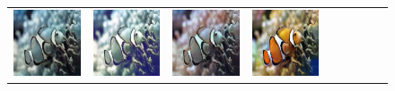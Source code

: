 \begin{figure}[t]
\begin{center}
\begin{tabular}{ccccccccc}
			\includegraphics[width = 0.10\linewidth,height=0.10\linewidth]{figures/ch3/compare/EUVP/Ucolor/264298_00035269.jpg} & \hspace{-0.40cm}
			\includegraphics[width = 0.10\linewidth,height=0.10\linewidth]{figures/ch3/compare/EUVP/STSC/264298_00035269.jpg}   & \hspace{-0.40cm}
			\includegraphics[width = 0.10\linewidth,height=0.10\linewidth]{figures/ch3/compare/EUVP/Ushape/264298_00035269.jpg} & \hspace{-0.40cm}         
			\includegraphics[width = 0.10\linewidth,height=0.10\linewidth]{figures/ch3/compare/EUVP/Ours/264298_00035269.png}   \\


\end{tabular}
\end{center}
\end{figure}
